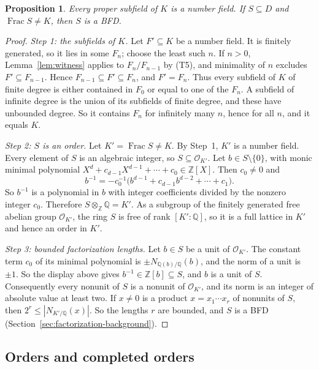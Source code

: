 \documentclass[11pt]{article}
\theoremstyle{plain}
\newtheorem{proposition}[theorem]{Proposition}
\theoremstyle{definition}
\theoremstyle{remark}
\DeclareMathOperator{\Frac}{Frac}
\newcommand{\Z}{\mathbb Z}
\newcommand{\Q}{\mathbb Q}
\newcommand{\OO}{\mathcal O}
\begin{document}
\begin{proposition}\label{prop:subfields}
Every proper subfield of $K$ is a number field.  If $S\subseteq D$ and
$\Frac S\ne K$, then $S$ is a BFD.
\end{proposition}
\begin{proof}
\emph{Step 1: the subfields of $K$.}  Let $F'\subseteq K$ be a number
field.  It is finitely generated, so it lies in some $F_n$; choose the
least such $n$.  If $n>0$, Lemma~\ref{lem:witness} applies to
$F_n/F_{n-1}$ by (T5), and minimality of $n$ excludes
$F'\subseteq F_{n-1}$.  Hence $F_{n-1}\subseteq F'\subseteq F_n$, and
$F'=F_n$.  Thus every subfield of $K$ of finite degree is either
contained in $F_0$ or equal to one of the $F_n$.  A subfield of infinite
degree is the union of its subfields of finite degree, and these have
unbounded degree.  So it contains $F_n$ for infinitely many $n$, hence for
all $n$, and it equals $K$.

\emph{Step 2: $S$ is an order.}  Let $K'=\Frac S\ne K$.  By Step~1, $K'$ is
a number field.  Every element of $S$ is an algebraic integer, so
$S\subseteq\OO_{K'}$.  Let $b\in S\setminus\{0\}$, with monic minimal
polynomial $X^d+c_{d-1}X^{d-1}+\cdots+c_0\in\Z[X]$.  Then $c_0\ne0$ and
\[
 b^{-1}=-c_0^{-1}\bigl(b^{d-1}+c_{d-1}b^{d-2}+\cdots+c_1\bigr).
\]
So $b^{-1}$ is a polynomial in $b$ with integer coefficients divided by
the nonzero integer $c_0$.  Therefore $S\otimes_\Z\Q=K'$.  As a subgroup
of the finitely generated free abelian group $\OO_{K'}$, the ring $S$ is
free of rank $[K':\Q]$, so it is a full lattice in $K'$ and hence an order
in $K'$.

\emph{Step 3: bounded factorization lengths.}  Let $b\in S$ be a unit of
$\OO_{K'}$.  The constant term $c_0$ of its minimal polynomial is
$\pm N_{\Q(b)/\Q}(b)$, and the norm of a unit is $\pm1$.  So the display
above gives $b^{-1}\in\Z[b]\subseteq S$, and $b$ is a unit of $S$.
Consequently every nonunit of $S$ is a nonunit of $\OO_{K'}$, and its norm
is an integer of absolute value at least two.  If $x\ne0$ is a product
$x=x_1\cdots x_r$ of nonunits of $S$, then
$2^r\leq|N_{K'/\Q}(x)|$.  So the lengths $r$ are bounded, and $S$ is a BFD
(Section~\ref{sec:factorization-background}).
\end{proof}

\subsection{Orders and completed orders}\label{sec:orders-completed}
\end{document}
